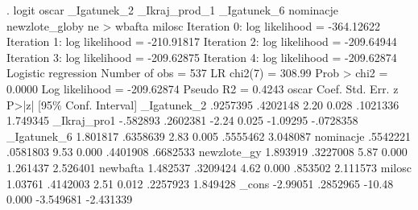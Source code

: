 . logit oscar _Igatunek_2 _Ikraj_prod_1 _Igatunek_6 nominacje newzlote_globy ne
> wbafta milosc
{\smallskip}
Iteration 0:   log likelihood = -364.12622  
Iteration 1:   log likelihood = -210.91817  
Iteration 2:   log likelihood = -209.64944  
Iteration 3:   log likelihood = -209.62875  
Iteration 4:   log likelihood = -209.62874  
{\smallskip}
Logistic regression                               Number of obs   =        537
                                                  LR chi2(7)      =     308.99
                                                  Prob > chi2     =     0.0000
Log likelihood = -209.62874                       Pseudo R2       =     0.4243
{\smallskip}
       oscar {\VBAR}      Coef.   Std. Err.      z    P>|z|     [95\% Conf. Interval]
 _Igatunek_2 {\VBAR}   .9257395   .4202148     2.20   0.028     .1021336    1.749345
_Ikraj_pro{\tytilde}1 {\VBAR}   -.582893   .2602381    -2.24   0.025     -1.09295   -.0728358
 _Igatunek_6 {\VBAR}   1.801817   .6358639     2.83   0.005     .5555462    3.048087
   nominacje {\VBAR}   .5542221   .0581803     9.53   0.000     .4401908    .6682533
newzlote_g{\tytilde}y {\VBAR}   1.893919   .3227008     5.87   0.000     1.261437    2.526401
    newbafta {\VBAR}   1.482537   .3209424     4.62   0.000      .853502    2.111573
      milosc {\VBAR}    1.03761   .4142003     2.51   0.012     .2257923    1.849428
       _cons {\VBAR}   -2.99051   .2852965   -10.48   0.000    -3.549681   -2.431339
